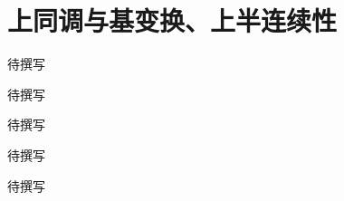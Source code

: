 
% 
% 

\chapter{上同调与基变换、上半连续性}
\label{g5:ch:20}

\begin{chapterabstract}
待撰写
\end{chapterabstract}

\begin{learninggoals}
待撰写
\end{learninggoals}

待撰写







\begin{chaptersummary}
待撰写
\end{chaptersummary}

\BookExercises
待撰写
